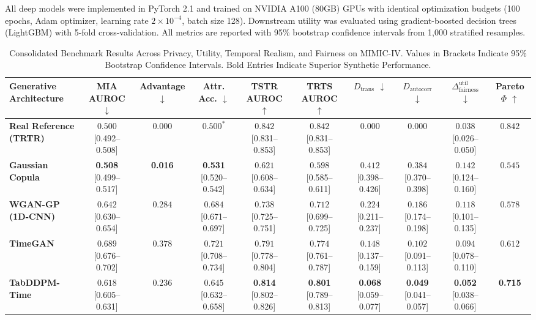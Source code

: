 \documentclass[journal]{IEEEtran}
\begin{document}
All deep models were implemented in PyTorch 2.1 and trained on NVIDIA A100 (80GB) GPUs with identical optimization budgets (100 epochs, Adam optimizer, learning rate $2 \times 10^{-4}$, batch size 128). Downstream utility was evaluated using gradient-boosted decision trees (LightGBM) with 5-fold cross-validation. All metrics are reported with 95\% bootstrap confidence intervals from 1,000 stratified resamples.

\begin{table}[t]
\centering
\caption{Consolidated Benchmark Results Across Privacy, Utility, Temporal Realism, and Fairness on MIMIC-IV. Values in Brackets Indicate 95\% Bootstrap Confidence Intervals. Bold Entries Indicate Superior Synthetic Performance.}
\label{tab:main_results}
\begin{tabular}{lccccccccc}
\toprule
\textbf{Generative Architecture} & \textbf{MIA AUROC} $\downarrow$ & \textbf{Advantage} $\downarrow$ & \textbf{Attr. Acc.} $\downarrow$ & \textbf{TSTR AUROC} $\uparrow$ & \textbf{TRTS AUROC} $\uparrow$ & \textbf{$D_{\text{trans}}$} $\downarrow$ & \textbf{$D_{\text{autocorr}}$} $\downarrow$ & \textbf{$\Delta_{\text{fairness}}^{\text{util}}$} $\downarrow$ & \textbf{Pareto $\Phi$} $\uparrow$ \\
\midrule
\textbf{Real Reference (TRTR)} & $0.500$ \scriptsize{[0.492--0.508]} & $0.000$ & $0.500^*$ & $0.842$ \scriptsize{[0.831--0.853]} & $0.842$ \scriptsize{[0.831--0.853]} & $0.000$ & $0.000$ & $0.038$ \scriptsize{[0.026--0.050]} & $0.842$ \\
\textbf{Gaussian Copula} & \textbf{0.508} \scriptsize{[0.499--0.517]} & \textbf{0.016} & \textbf{0.531} \scriptsize{[0.520--0.542]} & $0.621$ \scriptsize{[0.608--0.634]} & $0.598$ \scriptsize{[0.585--0.611]} & $0.412$ \scriptsize{[0.398--0.426]} & $0.384$ \scriptsize{[0.370--0.398]} & $0.142$ \scriptsize{[0.124--0.160]} & $0.545$ \\
\textbf{WGAN-GP (1D-CNN)} & $0.642$ \scriptsize{[0.630--0.654]} & $0.284$ & $0.684$ \scriptsize{[0.671--0.697]} & $0.738$ \scriptsize{[0.725--0.751]} & $0.712$ \scriptsize{[0.699--0.725]} & $0.224$ \scriptsize{[0.211--0.237]} & $0.186$ \scriptsize{[0.174--0.198]} & $0.118$ \scriptsize{[0.101--0.135]} & $0.578$ \\
\textbf{TimeGAN} & $0.689$ \scriptsize{[0.676--0.702]} & $0.378$ & $0.721$ \scriptsize{[0.708--0.734]} & $0.791$ \scriptsize{[0.778--0.804]} & $0.774$ \scriptsize{[0.761--0.787]} & $0.148$ \scriptsize{[0.137--0.159]} & $0.102$ \scriptsize{[0.091--0.113]} & $0.094$ \scriptsize{[0.078--0.110]} & $0.612$ \\
\textbf{TabDDPM-Time} & $0.618$ \scriptsize{[0.605--0.631]} & $0.236$ & $0.645$ \scriptsize{[0.632--0.658]} & \textbf{0.814} \scriptsize{[0.802--0.826]} & \textbf{0.801} \scriptsize{[0.789--0.813]} & \textbf{0.068} \scriptsize{[0.059--0.077]} & \textbf{0.049} \scriptsize{[0.041--0.057]} & \textbf{0.052} \scriptsize{[0.038--0.066]} & \textbf{0.715} \\
\bottomrule
\end{tabular}
\end{table}
\end{document}
